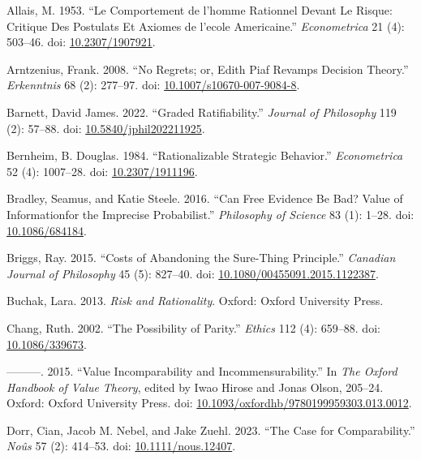 \documentclass[
  10pt,
  letterpaper,
  DIV=11,
  numbers=noendperiod,
  twoside]{scrartcl}
\newlength{\cslhangindent}
\newenvironment{CSLReferences}[2] %
 {\begin{list}{}{%
  \setlength{\itemindent}{0pt}
  \setlength{\leftmargin}{0pt}
  \setlength{\parsep}{0pt}
  \ifodd #1
   \setlength{\leftmargin}{\cslhangindent}
   \setlength{\itemindent}{-1\cslhangindent}
  \fi
  \setlength{\itemsep}{#2\baselineskip}}}
 {\end{list}}
\begin{document}
\label{refs}
\begin{CSLReferences}{1}{0}
Allais, M. 1953. {``Le Comportement de l'homme Rationnel Devant Le
Risque: Critique Des Postulats Et Axiomes de l'ecole Americaine.''}
\emph{Econometrica} 21 (4): 503--46. doi:
\href{https://doi.org/10.2307/1907921}{10.2307/1907921}.

Arntzenius, Frank. 2008. {``No Regrets; or, Edith Piaf Revamps Decision
Theory.''} \emph{Erkenntnis} 68 (2): 277--97. doi:
\href{https://doi.org/10.1007/s10670-007-9084-8}{10.1007/s10670-007-9084-8}.

Barnett, David James. 2022. {``Graded Ratifiability.''} \emph{Journal of
Philosophy} 119 (2): 57--88. doi:
\href{https://doi.org/10.5840/jphil202211925}{10.5840/jphil202211925}.

Bernheim, B. Douglas. 1984. {``Rationalizable Strategic Behavior.''}
\emph{Econometrica} 52 (4): 1007--28. doi:
\href{https://doi.org/10.2307/1911196}{10.2307/1911196}.

Bradley, Seamus, and Katie Steele. 2016. {``Can Free Evidence Be Bad?
Value of Informationfor the Imprecise Probabilist.''} \emph{Philosophy
of Science} 83 (1): 1--28. doi:
\href{https://doi.org/10.1086/684184}{10.1086/684184}.

Briggs, Ray. 2015. {``Costs of Abandoning the Sure-Thing Principle.''}
\emph{Canadian Journal of Philosophy} 45 (5): 827--40. doi:
\href{https://doi.org/10.1080/00455091.2015.1122387}{10.1080/00455091.2015.1122387}.

Buchak, Lara. 2013. \emph{Risk and Rationality}. Oxford: Oxford
University Press.

Chang, Ruth. 2002. {``The Possibility of Parity.''} \emph{Ethics} 112
(4): 659--88. doi:
\href{https://doi.org/10.1086/339673}{10.1086/339673}.

---------. 2015. {``Value Incomparability and Incommensurability.''} In
\emph{The Oxford Handbook of Value Theory}, edited by Iwao Hirose and
Jonas Olson, 205--24. Oxford: Oxford University Press. doi:
\href{https://doi.org/10.1093/oxfordhb/9780199959303.013.0012}{10.1093/oxfordhb/9780199959303.013.0012}.

Dorr, Cian, Jacob M. Nebel, and Jake Zuehl. 2023. {``The Case for
Comparability.''} \emph{Noûs} 57 (2): 414--53. doi:
\href{https://doi.org/10.1111/nous.12407}{10.1111/nous.12407}.


\end{CSLReferences}
\end{document}
